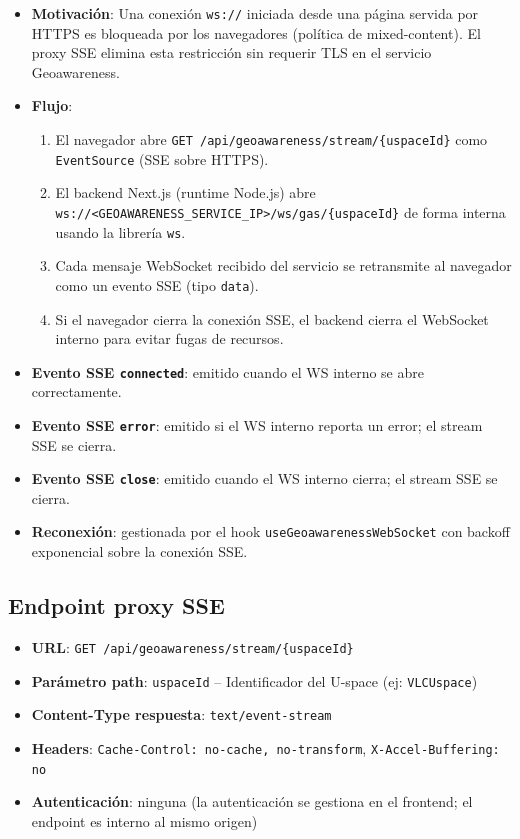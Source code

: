 \documentclass[12pt,a4paper]{article}
\begin{document}
\begin{itemize}
    \item \textbf{Motivación}: Una conexión \texttt{ws://} iniciada desde una página servida por HTTPS es bloqueada por los navegadores (política de mixed-content). El proxy SSE elimina esta restricción sin requerir TLS en el servicio Geoawareness.
    \item \textbf{Flujo}:
    \begin{enumerate}
        \item El navegador abre \texttt{GET /api/geoawareness/stream/\{uspaceId\}} como \texttt{EventSource} (SSE sobre HTTPS).
        \item El backend Next.js (runtime Node.js) abre \texttt{ws://<GEOAWARENESS\_SERVICE\_IP>/ws/gas/\{uspaceId\}} de forma interna usando la librería \texttt{ws}.
        \item Cada mensaje WebSocket recibido del servicio se retransmite al navegador como un evento SSE (tipo \texttt{data}).
        \item Si el navegador cierra la conexión SSE, el backend cierra el WebSocket interno para evitar fugas de recursos.
    \end{enumerate}
    \item \textbf{Evento SSE \texttt{connected}}: emitido cuando el WS interno se abre correctamente.
    \item \textbf{Evento SSE \texttt{error}}: emitido si el WS interno reporta un error; el stream SSE se cierra.
    \item \textbf{Evento SSE \texttt{close}}: emitido cuando el WS interno cierra; el stream SSE se cierra.
    \item \textbf{Reconexión}: gestionada por el hook \texttt{useGeoawarenessWebSocket} con backoff exponencial sobre la conexión SSE.
\end{itemize}

\subsection{Endpoint proxy SSE}
\begin{itemize}
    \item \textbf{URL}: \texttt{GET /api/geoawareness/stream/\{uspaceId\}}
    \item \textbf{Parámetro path}: \texttt{uspaceId} -- Identificador del U-space (ej: \texttt{VLCUspace})
    \item \textbf{Content-Type respuesta}: \texttt{text/event-stream}
    \item \textbf{Headers}: \texttt{Cache-Control: no-cache, no-transform}, \texttt{X-Accel-Buffering: no}
    \item \textbf{Autenticación}: ninguna (la autenticación se gestiona en el frontend; el endpoint es interno al mismo origen)
\end{itemize}
\end{document}
